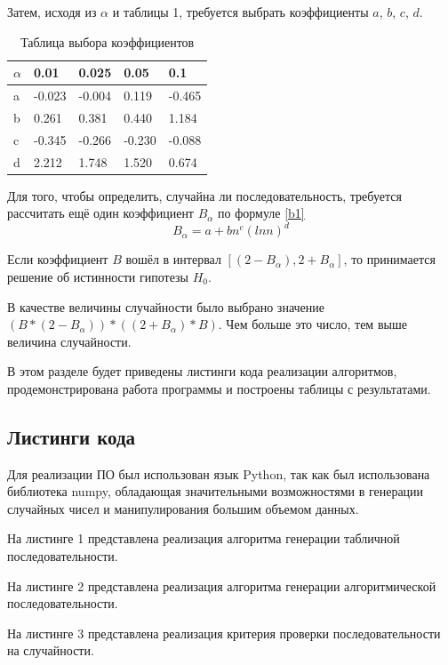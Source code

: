 Затем, исходя из $\alpha$ и таблицы 1, требуется выбрать коэффициенты $a$, $b$, $c$, $d$. 

\FloatBarrier
\begin{table}[h]
	\label{t}
	\caption{Таблица выбора коэффициентов}
	\centering
	\begin{tabular}{ | l | l | l | l | l |}
		\hline
		$\alpha$ & 0.01 & 0.025 & 0.05 & 0.1 \\ 
		\hline
		a & -0.023 & -0.004 & 0.119 & -0.465 \\
		b & 0.261 & 0.381 & 0.440 & 1.184 \\
		c & -0.345 & -0.266 & -0.230 & -0.088 \\
		d & 2.212 & 1.748 & 1.520 & 0.674 \\
		\hline
	\end{tabular}
\end{table}
\FloatBarrier

Для того, чтобы определить, случайна ли последовательность, требуется рассчитать ещё один коэффициент $B_{\alpha}$ по формуле \ref{b1}
\begin{equation}
	\label{b1}
	B_{\alpha} = a+bn^c(ln n)^d
\end{equation}

Если коэффициент $B$ вошёл в интервал $[(2 - B_{\alpha}), 2 + B_{\alpha}]$, то принимается решение об истинности гипотезы $H_0$.

В качестве величины случайности было выбрано значение $ (B * (2 - B_\alpha)) * ((2 + B_\alpha) * B)$. Чем больше это число, тем выше величина случайности.

\newpage

В этом разделе будет приведены листинги кода реализации алгоритмов, продемонстрирована работа программы и построены таблицы с результатами.

\subsection*{Листинги кода}
Для реализации ПО был использован язык Python, так как был использована библиотека numpy, обладающая значительными возможностями в генерации случайных чисел и манипулирования большим объемом данных.

На листинге 1 представлена реализация алгоритма генерации табличной последовательности.

На листинге 2 представлена реализация алгоритма генерации алгоритмической последовательности. 

На листинге 3 представлена реализация критерия проверки последовательности на случайности.

